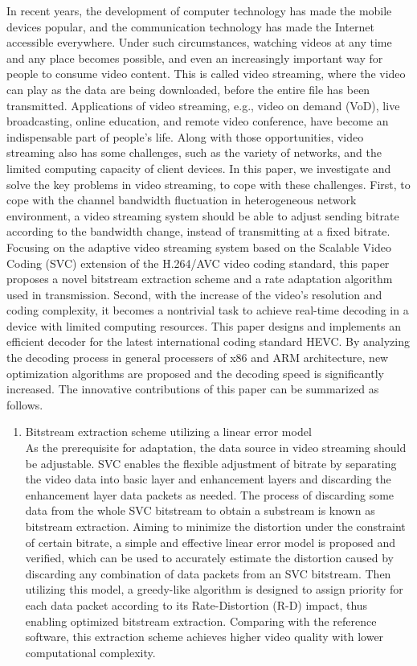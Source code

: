 \begin{eabstract}
In recent years, the development of computer technology has made the mobile devices popular, and the communication technology has made the Internet accessible everywhere. Under such circumstances, watching videos at any time and any place becomes possible, and even an increasingly important way for people to consume video content. This is called video streaming, where the video can play as the data are being downloaded, before the entire file has been transmitted. Applications of video streaming, e.g., video on demand (VoD), live broadcasting, online education, and remote video conference, have become an indispensable part of people's life. Along with those opportunities, video streaming also has some challenges, such as the variety of networks, and the limited computing capacity of client devices. In this paper, we investigate and solve the key problems in video streaming, to cope with these challenges. First, to cope with the channel bandwidth fluctuation in heterogeneous network environment, a video streaming system should be able to adjust sending bitrate according to the bandwidth change, instead of transmitting at a fixed bitrate. Focusing on the adaptive video streaming system based on the Scalable Video Coding (SVC) extension of the H.264/AVC video coding standard, this paper proposes a novel bitstream extraction scheme and a rate adaptation algorithm used in transmission. Second, with the increase of the video's resolution and coding complexity, it becomes a nontrivial task to achieve real-time decoding in a device with limited computing resources. This paper designs and implements an efficient decoder for the latest international coding standard HEVC. By analyzing the decoding process in general processers of x86 and ARM architecture, new optimization algorithms are proposed and the decoding speed is significantly increased. The innovative contributions of this paper can be summarized as follows.
\begin{enumerate}
\item {Bitstream extraction scheme utilizing a linear error model}\\
As the prerequisite for adaptation, the data source in video streaming should be adjustable. SVC enables the flexible adjustment of bitrate by separating the video data into basic layer and enhancement layers and discarding the enhancement layer data packets as needed. The process of discarding some data from the whole SVC bitstream to obtain a substream is known as bitstream extraction. Aiming to minimize the distortion under the constraint of certain bitrate, a simple and effective linear error model is proposed and verified, which can be used to accurately estimate the distortion caused by discarding any combination of data packets from an SVC bitstream. Then utilizing this model, a greedy-like algorithm is designed to assign priority for each data packet according to its Rate-Distortion (R-D) impact, thus enabling optimized bitstream extraction. Comparing with the reference software, this extraction scheme achieves higher video quality with lower computational complexity.

\end{enumerate}
\end{eabstract}
